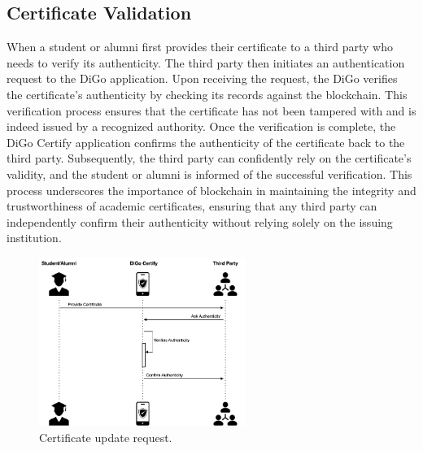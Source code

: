 \subsection{Certificate Validation}

When a student or alumni first provides their certificate to a third party who needs to verify its authenticity. The third party then initiates an authentication request to the DiGo application. Upon receiving the request, the DiGo verifies the certificate's authenticity by checking its records against the blockchain. This verification process ensures that the certificate has not been tampered with and is indeed issued by a recognized authority. Once the verification is complete, the DiGo Certify application confirms the authenticity of the certificate back to the third party. Subsequently, the third party can confidently rely on the certificate's validity, and the student or alumni is informed of the successful verification. This process underscores the importance of blockchain in maintaining the integrity and trustworthiness of academic certificates, ensuring that any third party can independently confirm their authenticity without relying solely on the issuing institution.

\begin{figure}[H]
    \centering
    \includegraphics[width=0.6\textwidth]{../diagrams/certificate-validation-diagram-sequence.drawio.png}
    \caption{Certificate update request.}
    \label{fig:certificate-validation}
\end{figure}